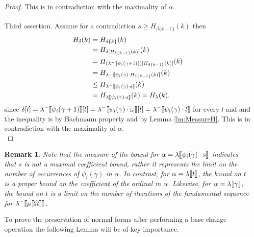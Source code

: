 \documentclass{amsart}
\theoremstyle{plain}
\theoremstyle{plain}
\newtheorem{remark}[theorem]{Remark}
\def\scbrl{[\hspace{-.14em}[}
\def\scbrr{]\hspace{-.14em}]}
\def\scbr#1{\scbrl#1\scbrr}
\newcommand{\Om}{{\Omega}}
\newcommand{\al}{{\alpha}}
\newcommand{\be}{{\beta}}
\newcommand{\ga}{\gamma}
\newcommand{\de}{\delta}
\newcommand{\la}{\lambda}
\newcommand{\om}{\omega}
\def\scbrl{[\hspace{-.14em}[}
\def\scbrr{]\hspace{-.14em}]}
\def\scbr#1{\scbrl#1\scbrr}
\begin{document}
\begin{proof}
This is in contradiction with the maximality of $\al$.\medskip\\
\\
Third assertion.
Assume for a contradiction $s\geq H_{\be\{k-1\}}(k)$ then
\begin{align*}
    H_\de(k) &=H_{\de\{k\}}(k) \\
    &=H_{\de[H_{\de\{k-1\}}(k)]} (k) \\
    &= H_{(\la^-\scbr{\psi_i(\ga+1)}) [H_{\de\{k-1\}}(k)] }(k)\\
    &= H_{\la^-\scbr{\psi_i(\ga) \cdot  H_{\de\{k-1\}}(k) } }(k)\\	
    &\leq H_{\la^-\scbr{\psi_i(\ga) \cdot  s } }(k)\\
    &= H_{\la\scbr{\psi_i(\ga) \cdot s }}(k) = H_{\la}(k).
\end{align*}
since $\de[l] = \la^-\scbr{\psi_i(\ga+1)}[l] =  \la^-\scbr{\psi_i(\ga) \cdot \om}[l] =  \la^-\scbr{\psi_i(\ga) \cdot l}$ for every $l$  and
and the inequality is by Bachmann property and by Lemma \ref{lm:MeasureH}.
This is in contradiction with the maximality of $\al$.\medskip\\
\end{proof}

\begin{remark}
Note that the measure of the bound for  $\al = \la\scbr{\psi_i(\ga)\cdot s}$ indicates that $s$ is not a maximal coefficient bound, rather it represents the limit on the number of occurrences of $\psi_i(\ga)$ in $\al$.  In contrast, for $\al=\la\scbr{t}$, the bound on $t$ is a proper bound on the coefficient of the ordinal in $\al$. Likewise, for $\al=\la\scbr{\ga}$, the bound on $t$ is a limit on the number of iterations of the fundamental sequence for $\la^-\scbr{\mu\scbr{\Om}}$.\medskip
\end{remark}

To prove the preservation of normal forms after performing a base change operation the following Lemma will be of key importance.\smallskip
\end{document}
